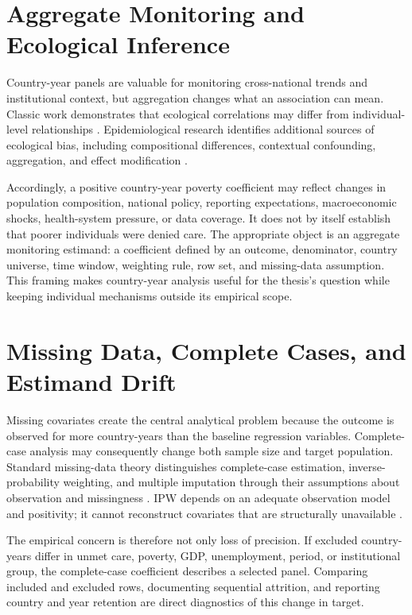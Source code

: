\section{Aggregate Monitoring and Ecological Inference}

Country-year panels are valuable for monitoring cross-national trends and institutional context, but aggregation changes what an association can mean. Classic work demonstrates that ecological correlations may differ from individual-level relationships \citep{robinson_1950}. Epidemiological research identifies additional sources of ecological bias, including compositional differences, contextual confounding, aggregation, and effect modification \citep{greenland_morgenstern_1989}.

Accordingly, a positive country-year poverty coefficient may reflect changes in population composition, national policy, reporting expectations, macroeconomic shocks, health-system pressure, or data coverage. It does not by itself establish that poorer individuals were denied care. The appropriate object is an aggregate monitoring estimand: a coefficient defined by an outcome, denominator, country universe, time window, weighting rule, row set, and missing-data assumption. This framing makes country-year analysis useful for the thesis's question while keeping individual mechanisms outside its empirical scope.

\section{Missing Data, Complete Cases, and Estimand Drift}

Missing covariates create the central analytical problem because the outcome is observed for more country-years than the baseline regression variables. Complete-case analysis may consequently change both sample size and target population. Standard missing-data theory distinguishes complete-case estimation, inverse-probability weighting, and multiple imputation through their assumptions about observation and missingness \citep{rubin_1987,little_rubin_2019}. IPW depends on an adequate observation model and positivity; it cannot reconstruct covariates that are structurally unavailable \citep{seaman_white_2013}.

The empirical concern is therefore not only loss of precision. If excluded country-years differ in unmet care, poverty, GDP, unemployment, period, or institutional group, the complete-case coefficient describes a selected panel. Comparing included and excluded rows, documenting sequential attrition, and reporting country and year retention are direct diagnostics of this change in target.

